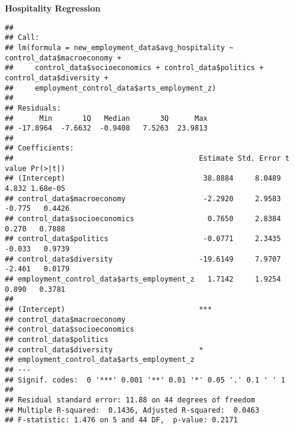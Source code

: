 \documentclass[
]{article}
\newenvironment{Shaded}{\begin{snugshade}}{\end{snugshade}}
\newcommand{\CommentTok}[1]{\textcolor[rgb]{0.56,0.35,0.01}{\textit{#1}}}
\newcommand{\FunctionTok}[1]{\textcolor[rgb]{0.13,0.29,0.53}{\textbf{#1}}}
\newcommand{\NormalTok}[1]{#1}
\newcommand{\OtherTok}[1]{\textcolor[rgb]{0.56,0.35,0.01}{#1}}
\newcommand{\SpecialCharTok}[1]{\textcolor[rgb]{0.81,0.36,0.00}{\textbf{#1}}}
\begin{document}
\textbf{Hospitality Regression}

\begin{Shaded}
\end{Shaded}

\begin{verbatim}
## 
## Call:
## lm(formula = new_employment_data$avg_hospitality ~ control_data$macroeconomy + 
##     control_data$socioeconomics + control_data$politics + control_data$diversity + 
##     employment_control_data$arts_employment_z)
## 
## Residuals:
##      Min       1Q   Median       3Q      Max 
## -17.8964  -7.6632  -0.9408   7.5263  23.9813 
## 
## Coefficients:
##                                           Estimate Std. Error t value Pr(>|t|)
## (Intercept)                                38.8884     8.0489   4.832 1.68e-05
## control_data$macroeconomy                  -2.2920     2.9583  -0.775   0.4426
## control_data$socioeconomics                 0.7650     2.8384   0.270   0.7888
## control_data$politics                      -0.0771     2.3435  -0.033   0.9739
## control_data$diversity                    -19.6149     7.9707  -2.461   0.0179
## employment_control_data$arts_employment_z   1.7142     1.9254   0.890   0.3781
##                                              
## (Intercept)                               ***
## control_data$macroeconomy                    
## control_data$socioeconomics                  
## control_data$politics                        
## control_data$diversity                    *  
## employment_control_data$arts_employment_z    
## ---
## Signif. codes:  0 '***' 0.001 '**' 0.01 '*' 0.05 '.' 0.1 ' ' 1
## 
## Residual standard error: 11.88 on 44 degrees of freedom
## Multiple R-squared:  0.1436, Adjusted R-squared:  0.0463 
## F-statistic: 1.476 on 5 and 44 DF,  p-value: 0.2171
\end{verbatim}
\end{document}
